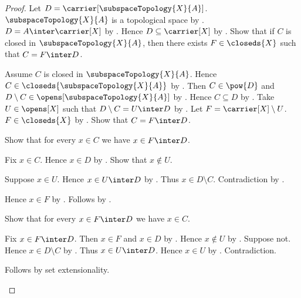 \begin{proof}
    Let $D=\carrier[\subspaceTopology{X}{A}]$.
    $\subspaceTopology{X}{A}$ is a topological space
        by .
    $D=A\inter\carrier[X]$ by .
    Hence $D\subseteq\carrier[X]$ by .
    Show that if $C$ is closed in $\subspaceTopology{X}{A}$, then
        there exists $F\in\closeds{X}$ such that $C=F\inter D$.
    \begin{subproof}
        Assume $C$ is closed in $\subspaceTopology{X}{A}$.
        Hence $C\in\closeds{\subspaceTopology{X}{A}}$
            by .
        Then $C\in\pow{D}$ and
            $D\setminus C\in\opens[\subspaceTopology{X}{A}]$
            by .
        Hence $C\subseteq D$ by .
        Take $U\in\opens[X]$ such that
            $D\setminus C=U\inter D$
            by .
        Let $F=\carrier[X]\setminus U$.
        $F\in\closeds{X}$
            by .
        Show that $C=F\inter D$.
        \begin{subproof}
            Show that for every $x\in C$ we have $x\in F\inter D$.
            \begin{subproof}
                Fix $x\in C$.
                Hence $x\in D$ by .
                Show that $x\notin U$.
                \begin{subproof}
                    Suppose $x\in U$.
                    Hence $x\in U\inter D$ by .
                    Thus $x\in D\setminus C$.
                    Contradiction by .
                \end{subproof}
                Hence $x\in F$ by .
                Follows by .
            \end{subproof}
            Show that for every $x\in F\inter D$ we have $x\in C$.
            \begin{subproof}
                Fix $x\in F\inter D$.
                Then $x\in F$ and $x\in D$ by .
                Hence $x\notin U$ by .
                Suppose not.
                Hence $x\in D\setminus C$ by .
                Thus $x\in U\inter D$.
                Hence $x\in U$ by .
                Contradiction.
            \end{subproof}
            Follows by set extensionality.
        \end{subproof}

\end{subproof}
\end{proof}
